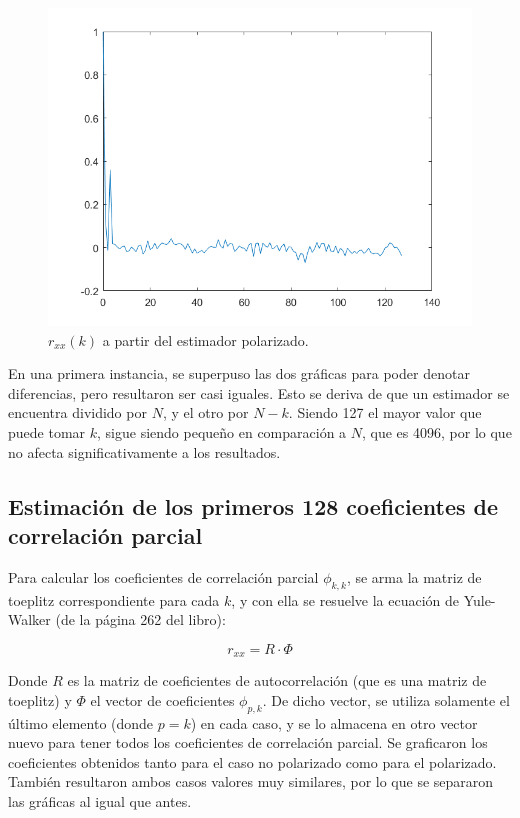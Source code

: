\begin{figure}[H] %
\centering
\includegraphics[scale=0.45]{../EJ1/rxxP}
\caption{$r_{xx}(k)$ a partir del estimador polarizado.}
\label{rxxP}
\end{figure}

En una primera instancia, se superpuso las dos gráficas para poder denotar diferencias, pero resultaron ser casi iguales. Esto se deriva de que un estimador se encuentra dividido por $N$, y el otro por $N-k$. Siendo 127 el mayor valor que puede tomar $k$, sigue siendo pequeño en comparación a $N$, que es 4096, por lo que no afecta significativamente a los resultados. 

\subsection{Estimaci\'on de los primeros 128 coeficientes de correlaci\'on parcial}

Para calcular los coeficientes de correlación parcial $\phi_{k,k}$, se arma la matriz de toeplitz correspondiente para cada $k$, y con ella se resuelve la ecuación de Yule-Walker (de la página 262 del libro):

\[
r_{xx} = R \cdot \Phi
\]

Donde $R$ es la matriz de coeficientes de autocorrelación (que es una matriz de toeplitz) y $\Phi$ el vector de coeficientes $\phi_{p,k}$. De dicho vector, se utiliza solamente el último elemento (donde $p=k$) en cada caso, y se lo almacena en otro vector nuevo para tener todos los coeficientes de correlación parcial. Se graficaron los coeficientes obtenidos tanto para el caso no polarizado como para el polarizado. También resultaron ambos casos valores muy similares, por lo que se separaron las gráficas al igual que antes.

